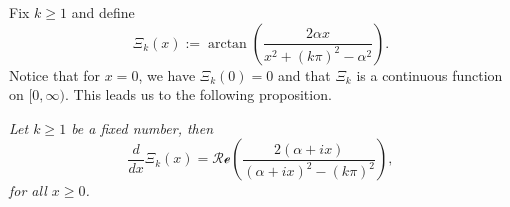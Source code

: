 \documentclass[preprint,12pt,nopreprintline]{elsarticle}
\begin{document}
Fix $k\geq 1$ and define 
\begin{equation}\label{eq:54}
\Xi_k\left(x\right):=\operatorname{arctan}\left(\frac{2\alpha x}{x^2+\left(k\pi\right)^2-\alpha^2}\right).
\end{equation}
Notice that for $x=0$, we have $\Xi_k\left(0\right)=0$ and that $\Xi_k$ is a continuous function on $[0,\infty)$. This leads us to the following proposition.
\begin{prop}\label{prop.2}
\textit{Let $k\geq 1$ be a fixed number, then}
\begin{equation}\label{eq:55}
\frac{d}{dx}\Xi_k\left(x\right)=\mathscr{Re}\left(\frac{2\left(\alpha+ix\right)}{\left(\alpha+ix\right)^2-\left(k\pi\right)^2}\right),
\end{equation}
\textit{for all $x\geq 0$.}
\end{prop}
\end{document}
